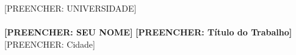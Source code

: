 \begin{capa}
  \center
  \ABNTEXchapterfont\large [PREENCHER: UNIVERSIDADE]\\
  [PREENCHER: FACULDADE/ESCOLA]\\
  [PREENCHER: CURSO]
  \vspace*{\fill}
  {\ABNTEXchapterfont\bfseries\Large [PREENCHER: SEU NOME]}
  \vspace*{\fill}
  {\ABNTEXchapterfont\bfseries\large [PREENCHER: Título do Trabalho]}
  \vspace*{\fill}
  {\large [PREENCHER: Cidade]\\ [PREENCHER: Ano]}
  \vspace*{1cm}
\end{capa}
